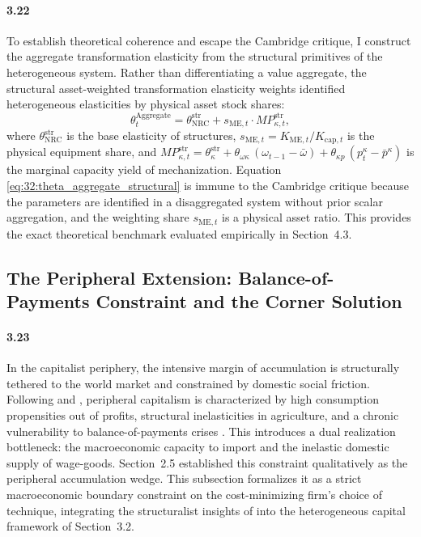 \paragraph{3.22}
To establish theoretical coherence and escape the Cambridge critique, I construct the aggregate transformation elasticity from the structural primitives of the heterogeneous system. Rather than differentiating a value aggregate, the structural asset-weighted transformation elasticity weights identified heterogeneous elasticities by physical asset stock shares:
\begin{equation}
	\theta^{\text{Aggregate}}_t = \theta_{\text{NRC}}^{\text{str}} + s_{\text{ME},t} \cdot MP_{\kappa,t}^{\text{str}},
	\label{eq:32:theta_aggregate_structural}
\end{equation}
where $\theta_{\text{NRC}}^{\text{str}}$ is the base elasticity of structures, $s_{\text{ME},t} = K_{\text{ME},t} / K_{\text{cap},t}$ is the physical equipment share, and $MP_{\kappa,t}^{\text{str}} = \theta_{\kappa}^{\text{str}} + \theta_{\omega\kappa}\, (\omega_{t-1} - \bar{\omega}) + \theta_{\kappa p}\, (p^{\kappa}_t - \bar{p}^{\kappa})$ is the marginal capacity yield of mechanization. Equation \eqref{eq:32:theta_aggregate_structural} is immune to the Cambridge critique because the parameters are identified in a disaggregated system without prior scalar aggregation, and the weighting share $s_{\text{ME},t}$ is a physical asset ratio. This provides the exact theoretical benchmark evaluated empirically in Section~4.3.




\subsection{The Peripheral Extension: Balance-of-Payments
	Constraint and the Corner Solution}

\paragraph{3.23}
In the capitalist periphery, the intensive margin of
accumulation is structurally tethered to the world market and
constrained by domestic social friction. Following
\citet{Prebisch1981} and \citet{Kaldor1959}, peripheral
capitalism is characterized by high consumption propensities
out of profits, structural inelasticities in agriculture, and
a chronic vulnerability to balance-of-payments crises
\citep{Ahumada2019}. This introduces a dual realization
bottleneck: the macroeconomic capacity to import and the
inelastic domestic supply of wage-goods. Section~2.5
established this constraint qualitatively as the peripheral
accumulation wedge. This subsection formalizes it as a strict
macroeconomic boundary constraint on the cost-minimizing
firm's choice of technique, integrating the structuralist
insights of \citet{Prebisch1981} into the heterogeneous
capital framework of Section~3.2.

